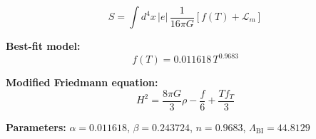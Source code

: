 
\begin{equation}
  S = \int d^4x \, |e| \, \frac{1}{16\pi G} \left[ f(T) + \mathcal{L}_m \right]
\end{equation}

\textbf{Best-fit model:}
\begin{equation}
  f(T) = 0.011618 \, T^{0.9683}
\end{equation}

\textbf{Modified Friedmann equation:}
\begin{equation}
  H^2 = \frac{8\pi G}{3} \rho - \frac{f}{6} + \frac{T f_T}{3}
\end{equation}

\textbf{Parameters:}
$\alpha = 0.011618$, \quad
$\beta = 0.243724$, \quad
$n = 0.9683$, \quad
$\Lambda_{\text{BI}} = 44.8129$